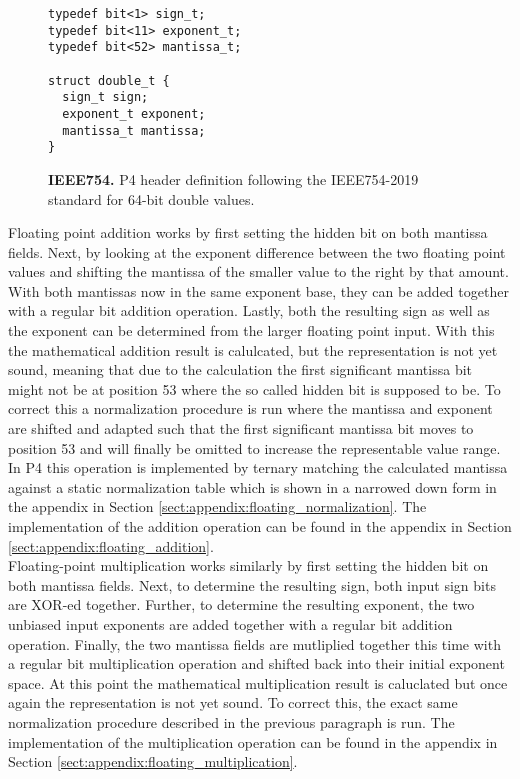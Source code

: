 \captionsetup[figure]{skip=-10pt} %
\begin{figure}[ht]
  \begin{lstlisting}[style=P4, basicstyle=\ttfamily]
typedef bit<1> sign_t;
typedef bit<11> exponent_t;
typedef bit<52> mantissa_t;

struct double_t {
  sign_t sign;
  exponent_t exponent;
  mantissa_t mantissa;
}\end{lstlisting}
  \caption[Double header definition in P4]{
    \textbf{IEEE754.} P4 header definition following the IEEE754-2019 standard for 64-bit double values.
  }
  \label{fig:double_header}
\end{figure}

Floating point addition works by first setting the hidden bit on both mantissa fields. Next, by looking at the exponent difference between the two floating point values and shifting the mantissa of the smaller value to the right by that amount. With both mantissas now in the same exponent base, they can be added together with a regular bit addition operation. Lastly, both the resulting sign as well as the exponent can be determined from the larger floating point input. With this the mathematical addition result is calulcated, but the representation is not yet sound, meaning that due to the calculation the first significant mantissa bit might not be at position 53 where the so called hidden bit is supposed to be. To correct this a normalization procedure is run where the mantissa and exponent are shifted and adapted such that the first significant mantissa bit moves to position 53 and will finally be omitted to increase the representable value range. In P4 this operation is implemented by ternary matching the calculated mantissa against a static normalization table which is shown in a narrowed down form in the appendix in Section \ref{sect:appendix:floating_normalization}. The implementation of the addition operation can be found in the appendix in Section \ref{sect:appendix:floating_addition}.\\

Floating-point multiplication works similarly by first setting the hidden bit on both mantissa fields. Next, to determine the resulting sign, both input sign bits are XOR-ed together. Further, to determine the resulting exponent, the two unbiased input exponents are added together with a regular bit addition operation. Finally, the two mantissa fields are mutliplied together this time with a regular bit multiplication operation and shifted back into their initial exponent space. At this point the mathematical multiplication result is caluclated but once again the representation is not yet sound. To correct this, the exact same normalization procedure described in the previous paragraph is run. The implementation of the multiplication operation can be found in the appendix in Section \ref{sect:appendix:floating_multiplication}.\\

